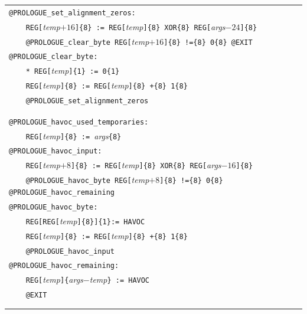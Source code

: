 \documentclass[10pt,twocolumn]{article}
\begin{document}
\begin{table}[!h]
\begin{center}
\def\arraystretch{1}
\begin{tabular}{l}



\texttt{@PROLOGUE\_set\_alignment\_zeros:}\\ %
\texttt{~~~~REG[}\textit{temp}$ +16 $\texttt{]\{8\} := REG[}\textit{temp}\texttt{]\{8\} XOR\{8\} REG[}\textit{args}$ -24 $\texttt{]\{8\}}\\ %
\texttt{~~~~@PROLOGUE\_clear\_byte REG[}\textit{temp}$ +16 $\texttt{]\{8\}
!=\{8\} 0\{8\} @EXIT}\\ %
\texttt{@PROLOGUE\_clear\_byte:}\\ %
\texttt{~~~~* REG[}\textit{temp}\texttt{]\{1\} := 0\{1\} }\\ %
\texttt{~~~~REG[}\textit{temp}\texttt{]\{8\} := REG[}\textit{temp}\texttt{]\{8\}
+\{8\} 1\{8\}}\\ %
\texttt{~~~~@PROLOGUE\_set\_alignment\_zeros}\\ %
\\ \\

\texttt{@PROLOGUE\_havoc\_used\_temporaries:}\\ %
\texttt{~~~~REG[}\textit{temp}\texttt{]\{8\} := }\textit{args}\texttt{\{8\}}\\ %
\texttt{@PROLOGUE\_havoc\_input:}\\ %
\texttt{~~~~REG[}\textit{temp}$ +8 $\texttt{]\{8\} :=
REG[}\textit{temp}\texttt{]\{8\} XOR\{8\} REG[}\textit{args}$ -16
$\texttt{]\{8\}}\\ %
\texttt{~~~~@PROLOGUE\_havoc\_byte REG[}\textit{temp}$ +8 $\texttt{]\{8\}
!=\{8\} 0\{8\} @PROLOGUE\_havoc\_remaining}\\ %
\texttt{@PROLOGUE\_havoc\_byte:}\\ %
\texttt{~~~~REG[REG[}\textit{temp}\texttt{]\{8\}]\{1\}:= HAVOC}\\ %
\texttt{~~~~REG[}\textit{temp}\texttt{]\{8\} := REG[}\textit{temp}\texttt{]\{8\}
+\{8\} 1\{8\}}\\ %
\texttt{~~~~@PROLOGUE\_havoc\_input}\\ %
\texttt{@PROLOGUE\_havoc\_remaining:}\\ %
\texttt{~~~~REG[}\textit{temp}\texttt{]\{}\textit{args}$ -
$\textit{temp}\texttt{\} := HAVOC}\\ %
\texttt{~~~~@EXIT}\\ %
\\ \\



\end{tabular}
\end{center}
\end{table}
\end{document}
